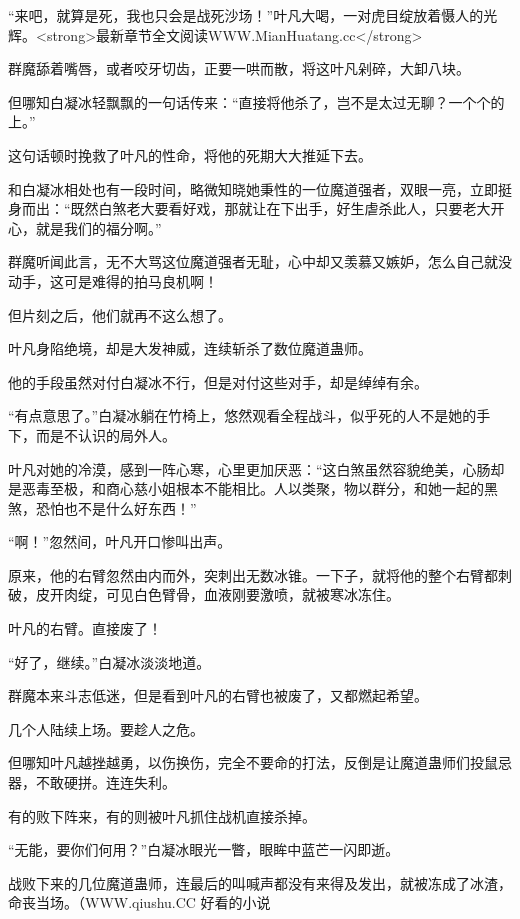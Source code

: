 
\begin{this_body}

“来吧，就算是死，我也只会是战死沙场！”叶凡大喝，一对虎目绽放着慑人的光辉。<strong>最新章节全文阅读WWW.MianHuatang.cc</strong>

群魔舔着嘴唇，或者咬牙切齿，正要一哄而散，将这叶凡剁碎，大卸八块。

但哪知白凝冰轻飘飘的一句话传来：“直接将他杀了，岂不是太过无聊？一个个的上。”

这句话顿时挽救了叶凡的性命，将他的死期大大推延下去。

和白凝冰相处也有一段时间，略微知晓她秉性的一位魔道强者，双眼一亮，立即挺身而出：“既然白煞老大要看好戏，那就让在下出手，好生虐杀此人，只要老大开心，就是我们的福分啊。”

群魔听闻此言，无不大骂这位魔道强者无耻，心中却又羡慕又嫉妒，怎么自己就没动手，这可是难得的拍马良机啊！

但片刻之后，他们就再不这么想了。

叶凡身陷绝境，却是大发神威，连续斩杀了数位魔道蛊师。

他的手段虽然对付白凝冰不行，但是对付这些对手，却是绰绰有余。

“有点意思了。”白凝冰躺在竹椅上，悠然观看全程战斗，似乎死的人不是她的手下，而是不认识的局外人。

叶凡对她的冷漠，感到一阵心寒，心里更加厌恶：“这白煞虽然容貌绝美，心肠却是恶毒至极，和商心慈小姐根本不能相比。人以类聚，物以群分，和她一起的黑煞，恐怕也不是什么好东西！”

“啊！”忽然间，叶凡开口惨叫出声。

原来，他的右臂忽然由内而外，突刺出无数冰锥。一下子，就将他的整个右臂都刺破，皮开肉绽，可见白色臂骨，血液刚要激喷，就被寒冰冻住。

叶凡的右臂。直接废了！

“好了，继续。”白凝冰淡淡地道。

群魔本来斗志低迷，但是看到叶凡的右臂也被废了，又都燃起希望。

几个人陆续上场。要趁人之危。

但哪知叶凡越挫越勇，以伤换伤，完全不要命的打法，反倒是让魔道蛊师们投鼠忌器，不敢硬拼。连连失利。

有的败下阵来，有的则被叶凡抓住战机直接杀掉。

“无能，要你们何用？”白凝冰眼光一瞥，眼眸中蓝芒一闪即逝。

战败下来的几位魔道蛊师，连最后的叫喊声都没有来得及发出，就被冻成了冰渣，命丧当场。（WWW.qiushu.CC 好看的小说


\end{this_body}
